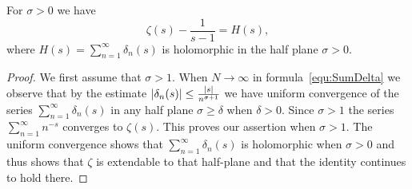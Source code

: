 \begin{corollary}\label{cor:ZetaCont}
	For $\sigma > 0$ we have
\begin{equation*}
	\zeta(s) - \frac{1}{s - 1} = H(s),
\end{equation*}
	where $H(s) = \sum _{n = 1} ^\infty \delta_n(s)$ is holomorphic in the half plane $\sigma > 0$. 
\end{corollary}
\begin{proof}
	We first assume that $\sigma > 1$. When $N \to \infty$ in formula~\ref{equ:SumDelta} we observe that by the estimate $\left|\delta_n(s)\right| \leq \frac{\left|s\right|}{n^{\sigma + 1}}$ we have uniform convergence of the series $\sum _{n = 1} ^\infty \delta_n(s)$ in any half plane $\sigma \geq \delta$ when $\delta > 0$. Since $\sigma > 1$ the series $\sum _{n = 1} ^{\infty} n^{-s}$ converges to $\zeta(s)$. This proves our assertion when $\sigma > 1$. The uniform convergence shows that $\sum _{n = 1} ^\infty \delta_n(s)$ is holomorphic when $\sigma > 0$ and thus shows that $\zeta$ is extendable to that half-plane and that the identity continues to hold there.
\end{proof}


